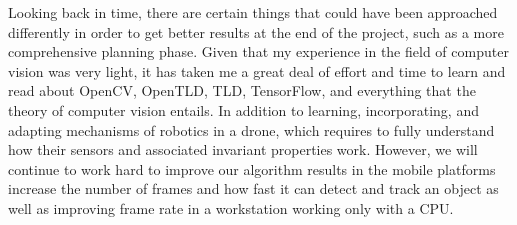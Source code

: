 Looking back in time, there are certain things that could have been approached differently in order to get better results at the end of the project, such as a more comprehensive planning phase. Given that my experience in the field of computer vision was very light, it has taken me a great deal of effort and time to learn and read about OpenCV, OpenTLD, TLD, TensorFlow,  and everything that the theory of computer vision entails. In addition to learning, incorporating, and adapting mechanisms of robotics in a drone, which requires to fully understand how their sensors and associated invariant properties work. However, we will continue to work hard to improve our algorithm results in the mobile platforms increase the number of frames and how fast it can detect and track an object as well as improving frame rate in a workstation working only with a CPU.



